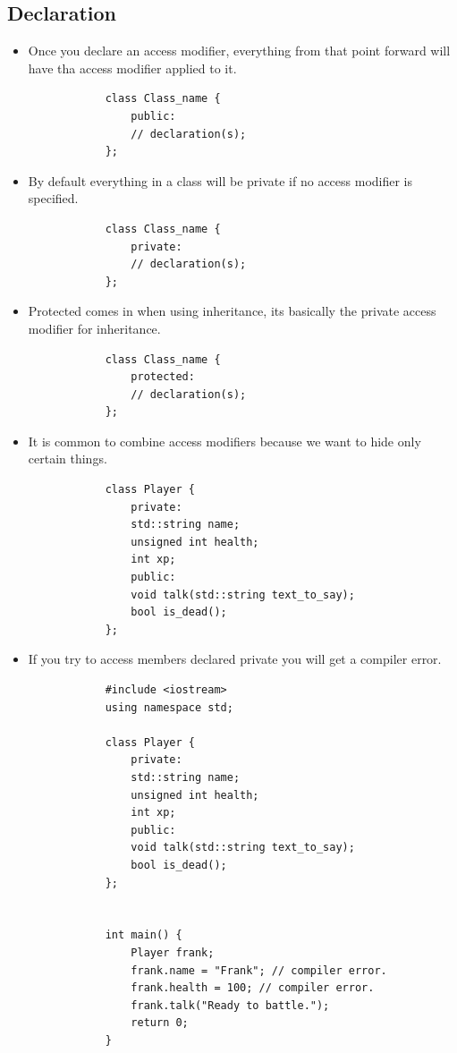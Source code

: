 \subsection{Declaration}
\begin{itemize}
    \item Once you declare an access modifier, everything from that point forward will have tha access modifier applied to it.
        \begin{verbatim}
            class Class_name {
                public: 
                // declaration(s);
            };
        \end{verbatim}
    
    \item By default everything in a class will be private if no access modifier is specified.
        \begin{verbatim}
            class Class_name {
                private: 
                // declaration(s);
            };
        \end{verbatim}
    
    \item Protected comes in when using inheritance, its basically the private access modifier for inheritance.
        \begin{verbatim}
            class Class_name {
                protected:
                // declaration(s);
            };
        \end{verbatim}
    
    \item It is common to combine access modifiers because we want to hide only certain things.
        \begin{verbatim}
            class Player {
                private:
                std::string name;
                unsigned int health;
                int xp;
                public:
                void talk(std::string text_to_say);
                bool is_dead();
            };
        \end{verbatim}
    
    \item If you try to access members declared private you will get a compiler error.
        \begin{verbatim}
            #include <iostream>
            using namespace std;

            class Player {
                private:
                std::string name;
                unsigned int health;
                int xp;
                public:
                void talk(std::string text_to_say);
                bool is_dead();
            };


            int main() {
                Player frank;
                frank.name = "Frank"; // compiler error.
                frank.health = 100; // compiler error.
                frank.talk("Ready to battle.");
                return 0;
            }
        \end{verbatim}
\end{itemize}


